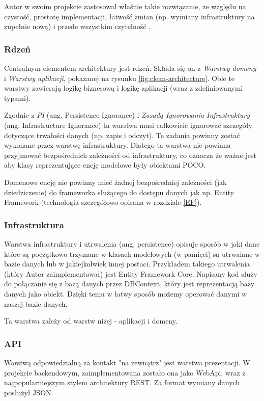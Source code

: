 \documentclass[12pt]{article}
\numberwithin{figure}{section}
\begin{document}
\begin{sloppypar}
Autor w swoim projekcie zastosował właśnie takie rozwiązanie, ze względu na czystość, prostotę implementacji, łatwość zmian (np. wymiany infrastruktury na zupełnie nową) i przede wszystkim czytelność \cite{clean-architecture}. 

    \subsubsection{Rdzeń} \label{core}
    Centralnym elementem architektury jest rdzeń. Składa się on z \textit{Warstwy domeny} i \textit{Warstwy aplikacji}, pokazanej na rysunku \ref{fig:clean-architecture}. Obie te warstwy zawierają logikę biznesową i logikę aplikacji (wraz z zdefiniowanymi typami). 
        
    Zgodnie z \textit{PI} (ang. Persistence Ignorance) i \textit{Zasadą Ignorowania Infrastruktury} (ang.  Infrastructure Ignorance) ta warstwa musi całkowicie ignorować szczegóły dotyczące trwałości danych (np. zapis i odczyt). Te zadania powinny zostać wykonane przez warstwę infrastruktury. Dlatego ta warstwa nie powinna przyjmować bezpośrednich zależności od infrastruktury, co oznacza że ważne jest aby klasy reprezentujące encję modelowe były obiektami POCO.
        
    Domenowe encję nie powinny mieć żadnej bezpośredniej zależności (jak dziedziczenie) do frameworka służącego do dostępu danych jak np. Entity Framework (technologia szczegółowo opisana w rozdziale \ref{EF}).
        
    \subsubsection{Infrastruktura}
    Warstwa infrastruktury i utrwalenia (ang. persistence) opisuje sposób w jaki dane które są początkowo trzymane w klasach modelowych (w pamięci) są utrwalane w bazie danych lub w jakiejkolwiek innej postaci. Przykładem takiego utrwalenia (który Autor zaimplementował) jest Entity Framework Core. Napisany kod służy do połączanie się z bazą danych przez DBContext, który jest reprezentacją bazy danych jako obiekt. Dzięki temu w łatwy sposób możemy operować danymi w naszej bazie danych.
        
    Ta warstwa zależy od warstw niżej - aplikacji i domeny.
        
    \subsubsection{API}
    Warstwą odpowiedzialną za kontakt "na zewnątrz" jest warstwa prezentacji. W projekcie backendowym, zaimplementowana zostało ona jako WebApi, wraz z najpopularniejszym stylem architektury REST. Za format wymiany danych posłużył JSON.
        

\end{sloppypar}
\end{document}

